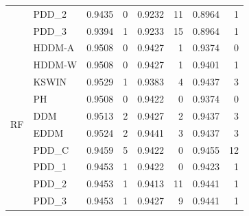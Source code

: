 \begin{table}[h]
{\begin{tabular}{llcrcrcr}
         & PDD\_2 & 0.9435 & 0 & 0.9232 & 11 & 0.8964 & 1 \\
         & PDD\_3 & 0.9394 & 1 & 0.9233 & 15 & 0.8964 & 1 \\ \midrule
        \multirow{10}{*}{RF} & HDDM-A & 0.9508 & 0 & 0.9427 & 1 & 0.9374 & 0 \\
         & HDDM-W & 0.9508 & 0 & 0.9427 & 1 & 0.9401 & 1 \\
         & KSWIN & 0.9529 & 1 & 0.9383 & 4 & 0.9437 & 3 \\
         & PH & 0.9508 & 0 & 0.9422 & 0 & 0.9374 & 0 \\
         & DDM & 0.9513 & 2 & 0.9427 & 2 & 0.9437 & 3 \\
         & EDDM & 0.9524 & 2 & 0.9441 & 3 & 0.9437 & 3 \\
         & PDD\_C & 0.9459 & 5 & 0.9422 & 0 & 0.9455 & 12 \\
         & PDD\_1 & 0.9453 & 1 & 0.9422 & 0 & 0.9423 & 1 \\
         & PDD\_2 & 0.9453 & 1 & 0.9413 & 11 & 0.9441 & 1 \\
         & PDD\_3 & 0.9453 & 1 & 0.9427 & 9 & 0.9441 & 1 \\\bottomrule
    \end{tabular}}
\end{table}
